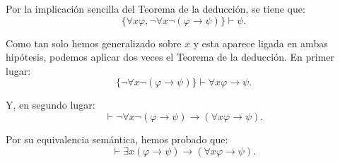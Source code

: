 \begin{ejercicio}
    Por la implicación sencilla del Teorema de la deducción, se tiene que:
    \begin{equation*}
        \{\forall x\varphi, \neg\forall x \neg (\varphi \rightarrow \psi)\} \vdash \psi.
    \end{equation*}

    Como tan solo hemos generalizado sobre $x$ y esta aparece ligada en ambas hipótesis, podemos aplicar dos veces el Teorema de la deducción. En primer lugar:
    \begin{equation*}
        \{\neg\forall x \neg (\varphi \rightarrow \psi)\} \vdash \forall x\varphi \rightarrow \psi.
    \end{equation*}

    Y, en segundo lugar:
    \begin{equation*}
        \vdash \neg\forall x \neg (\varphi \rightarrow \psi) \rightarrow (\forall x\varphi \rightarrow \psi).
    \end{equation*}

    Por su equivalencia semántica, hemos probado que:
    \begin{equation*}
        \vdash \exists x(\varphi \rightarrow \psi) \rightarrow (\forall x \varphi \rightarrow \psi).
    \end{equation*}
\end{ejercicio}

